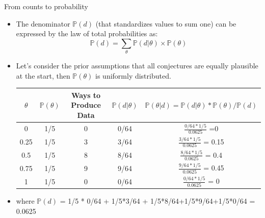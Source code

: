 \documentclass[handout]{beamer}
\begin{document}
\begin{frame}{From counts to probability}
\scriptsize{
\begin{itemize}
\item The denominator $\mathbb{P}(d)$ (that standardizes values to sum one) can be expressed by the law of total probabilities as: 
\begin{equation}
 \mathbb{P}(d) =  \sum_\theta \mathbb{P}(d|\theta) \times \mathbb{P}(\theta) 
\end{equation}

 \item Let's consider the prior assumptions that all conjectures are equally plausible at the start, then $\mathbb{P}(\theta)$ is uniformly distributed.  \\ 
 
 \vspace{0.3cm}
  \begin{tabular}{c|c|c|c|c} \hline
$\theta$ & $\mathbb{P}(\theta)$ & Ways to Produce Data & $\mathbb{P}(d|\theta)$ & $\mathbb{P}(\theta|d) = \mathbb{P}(d|\theta)*\mathbb{P}(\theta) / \mathbb{P}(d)$  \\ \hline
0 & 1/5 & 0 & 0/64 &  $\frac{0/64*1/5}{0.0625}$ =0 \\
0.25 & 1/5 & 3 & 3/64 & $\frac{3/64*1/5}{0.0625}$ = 0.15
\\
0.5 & 1/5 & 8 & 8/64 & $\frac{8/64*1/5}{0.0625}$ = 0.4 \\
0.75 & 1/5 & 9 & 9/64 & $\frac{9/64*1/5}{0.0625}$ = 0.45 \\
1 & 1/5 & 0 & 0/64 & $\frac{0/64*1/5}{0.0625}$ = 0 \\ 
\end{tabular} 
\vspace{0.3cm} 
 
\item where $\mathbb{P}(d)$ = 1/5 * 0/64 + 1/5*3/64 + 1/5*8/64+1/5*9/64+1/5*0/64 = 0.0625 
 
 
\end{itemize}
 } 
 

\end{frame}
\end{document}
